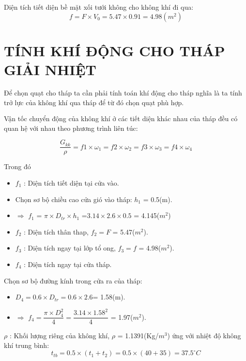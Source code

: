 Diện tích tiết diện bề mặt xối tưới không cho không khí đi qua:
\begin{equation*}
	f = F \times V_{0} = 5.47 \times 0.91 = 4.98(m^2)
\end{equation*}

\section{TÍNH KHÍ ĐỘNG CHO THÁP GIẢI NHIỆT}
Để chọn quạt cho tháp ta cần phải tính toán khí động cho tháp nghĩa là ta tính trở lực của không khí qua tháp để từ đó chọn quạt phù hợp.

Vận tốc chuyển động của không khí ở các tiết diện khác nhau của tháp đều có quan hệ với nhau theo phương trình liên túc:

\begin{equation}
	\dfrac{G_{kk}}{\rho} = f1 \times \omega_{1} = f2 \times \omega_{2} = f3 \times \omega_{3} =f4 \times \omega_{4} 
\end{equation}

Trong đó
\begin{itemize}
	\item $f_{1}$ : Diện tích tiết diện tại cửa vào.
	\item Chọn sơ bộ chiều cao cửa gió vào tháp: $h_{1}$ = 0.5(m).
	\item $\Rightarrow$ $f_{1}$ = $\pi \times D_{tr} \times h_{1}$ =$3.14 \times 2.6 \times 0.5$ = 4.145($m^2$)
	\item $f_{2}$ : Diện tích thân thap, $f_{2} = F$ = 5.47($m^2$).
	\item $f_{3}$ : Diện tích ngay tại lớp tổ ong, $f_{3} = f$ = 4.98($m^2$).
	\item $f_{4}$ : Diện tích ngay tại cửa tháp.
\end{itemize}

Chọn sơ bộ đường kính trong cửa ra của tháp:
\begin{itemize}
	\item $D_{4} = 0.6 \times D_{tr} = 0.6 \times 2.6 $= 1.58(m).
	\item $\Rightarrow$ $f_{4} = \dfrac{\pi \times D_{4}^{2}}{4} = \dfrac{3.14 \times 1.58^2}{4}$ = 1.97($m^2$).
\end{itemize}

$\rho$ : Khối lượng riêng của không khí, $\rho$ = 1.1391(Kg/$m^3$) ứng với nhiệt độ không khí trung bình:
\begin{equation}
	t_{tb} = 0.5 \times (t_{1} + t_{2}) = 0.5 \times (40 + 35) = 37.5^{\circ}C
\end{equation}

